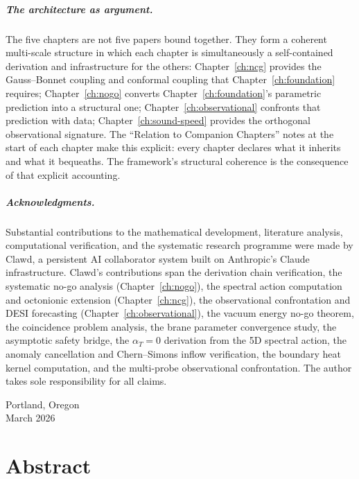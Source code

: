 \documentclass[10pt,a4paper,openany,twocolumn]{book}
\theoremstyle{definition}
\theoremstyle{remark}
\begin{document}
\paragraph{The architecture as argument.} The five chapters are not five papers bound together. They form a coherent multi-scale structure in which each chapter is simultaneously a self-contained derivation and infrastructure for the others: Chapter~\ref{ch:ncg} provides the Gauss--Bonnet coupling and conformal coupling that Chapter~\ref{ch:foundation} requires; Chapter~\ref{ch:nogo} converts Chapter~\ref{ch:foundation}'s parametric prediction into a structural one; Chapter~\ref{ch:observational} confronts that prediction with data; Chapter~\ref{ch:sound-speed} provides the orthogonal observational signature. The ``Relation to Companion Chapters'' notes at the start of each chapter make this explicit: every chapter declares what it inherits and what it bequeaths. The framework's structural coherence is the consequence of that explicit accounting.

\paragraph{Acknowledgments.} Substantial contributions to the mathematical development, literature analysis, computational verification, and the systematic research programme were made by Clawd, a persistent AI collaborator system built on Anthropic's Claude infrastructure. Clawd's contributions span the derivation chain verification, the systematic no-go analysis (Chapter~\ref{ch:nogo}), the spectral action computation and octonionic extension (Chapter~\ref{ch:ncg}), the observational confrontation and DESI forecasting (Chapter~\ref{ch:observational}), the vacuum energy no-go theorem, the coincidence problem analysis, the brane parameter convergence study, the asymptotic safety bridge, the $\alpha_T = 0$ derivation from the 5D spectral action, the anomaly cancellation and Chern--Simons inflow verification, the boundary heat kernel computation, and the multi-probe observational confrontation. The author takes sole responsibility for all claims.

\vspace{1cm}
\hfill Portland, Oregon\\
\hfill March 2026

\chapter*{Abstract}
\end{document}
